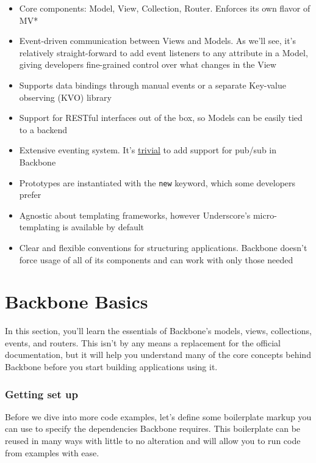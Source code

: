 \documentclass[9pt]{book}
\begin{document}
\begin{itemize}
\itemsep1pt\parskip0pt
\item
  Core components: Model, View, Collection, Router. Enforces its own
  flavor of MV*
\item
  Event-driven communication between Views and Models. As we'll see,
  it's relatively straight-forward to add event listeners to any
  attribute in a Model, giving developers fine-grained control over what
  changes in the View
\item
  Supports data bindings through manual events or a separate Key-value
  observing (KVO) library
\item
  Support for RESTful interfaces out of the box, so Models can be easily
  tied to a backend
\item
  Extensive eventing system. It's
  \href{http://lostechies.com/derickbailey/2011/07/19/references-routing-and-the-event-aggregator-coordinating-views-in-backbone-js/}{trivial}
  to add support for pub/sub in Backbone
\item
  Prototypes are instantiated with the \texttt{new} keyword, which some
  developers prefer
\item
  Agnostic about templating frameworks, however Underscore's
  micro-templating is available by default
\item
  Clear and flexible conventions for structuring applications. Backbone
  doesn't force usage of all of its components and can work with only
  those needed
\end{itemize}




\section{Backbone Basics}\label{backbone-basics}

In this section, you'll learn the essentials of Backbone's models,
views, collections, events, and routers. This isn't by any means a
replacement for the official documentation, but it will help you
understand many of the core concepts behind Backbone before you start
building applications using it.

\subsubsection{Getting set up}\label{getting-set-up}

Before we dive into more code examples, let's define some boilerplate
markup you can use to specify the dependencies Backbone requires. This
boilerplate can be reused in many ways with little to no alteration and
will allow you to run code from examples with ease.
\end{document}
